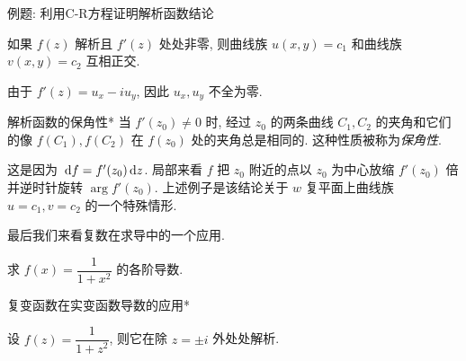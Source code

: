 \begin{frame}{例题: 利用C-R方程证明解析函数结论}
\beqskip{5pt}
\onslide<+->
\begin{example}
如果 $f(z)$ 解析且 $f'(z)$ 处处非零, 则曲线族 $u(x,y)=c_1$ 和曲线族 $v(x,y)=c_2$ 互相正交.
\end{example}
\onslide<+->
\begin{proof*}
由于 $f'(z)=u_x-iu_y$, 因此 $u_x,u_y$ 不全为零.

\end{proof*}
\endgroup
\end{frame}


\begin{frame}{解析函数的保角性*}
\onslide<+->
当 $f'(z_0)\neq 0$ 时, 
\onslide<+->
经过 $z_0$ 的两条曲线 $C_1,C_2$ 的夹角和它们的像 $f(C_1),f(C_2)$ 在 $f(z_0)$ 处的夹角总是相同的.
\onslide<+->
这种性质被称为\emph{保角性}.

\onslide<+->
这是因为 $\,\mathrm{d} f=f'(z_0)\,\mathrm{d} z$.
\onslide<+->
局部来看 $f$ 把 $z_0$ 附近的点以 $z_0$ 为中心放缩 $f'(z_0)$ 倍并逆时针旋转 $\arg{f'(z_0)}$.
\onslide<+->
上述例子是该结论关于 $w$ 复平面上曲线族 $u=c_1,v=c_2$ 的一个特殊情形.

\onslide<+->
最后我们来看复数在求导中的一个应用.
\onslide<+->
\begin{example}
求 $f(x)=\dfrac1{1+x^2}$ 的各阶导数.
\end{example}
\end{frame}


\begin{frame}{复变函数在实变函数导数的应用*}
\onslide<+->
\begin{solution}
设 $f(z)=\dfrac1{1+z^2}$, 则它在除 $z=\pm i$ 外处处解析.
\end{solution}
\end{frame}

